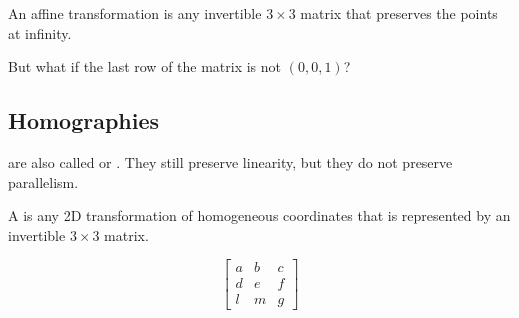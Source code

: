 \begin{definition}
    An affine transformation is any invertible $3 \times 3$ matrix that preserves the points at infinity.
\end{definition}

But what if the last row of the matrix is not $(0, 0, 1)$?

\subsection{Homographies}

 are also called  or . They still preserve linearity, but they do not preserve parallelism.

\begin{definition}
    A  is any 2D transformation of homogeneous coordinates that is represented by an invertible $3 \times 3$ matrix.

    \[
        \begin{bmatrix}
            a & b & c \\
            d & e & f \\
            l & m & g
        \end{bmatrix}
    \]
\end{definition}
